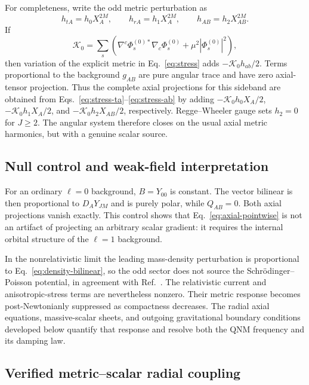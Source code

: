 For completeness, write the odd metric perturbation as
\begin{equation}
h_{tA}=h_0X_A^{2M},\qquad h_{rA}=h_1X_A^{2M},\qquad
h_{AB}=h_2X_{AB}^{2M}.
\label{eq:axial-metric}
\end{equation}
If
\begin{equation}
\mathcal K_0=\sum_s\left(
\nabla^c\Phi_s^{(0)*}\nabla_c\Phi_s^{(0)}
+\mu^2|\Phi_s^{(0)}|^2\right),
\end{equation}
then variation of the explicit metric in Eq.~\eqref{eq:stress} adds
$-\mathcal K_0h_{ab}/2$. Terms proportional to the background
$g_{AB}$ are pure angular trace and have zero axial-tensor projection. Thus
the complete axial projections for this sideband are obtained from
Eqs.~\eqref{eq:stress-ta}--\eqref{eq:stress-ab} by adding
$-\mathcal K_0h_0X_A/2$, $-\mathcal K_0h_1X_A/2$, and
$-\mathcal K_0h_2X_{AB}/2$, respectively. Regge--Wheeler gauge sets $h_2=0$
for $J\geq2$. The angular system therefore closes on the usual axial metric
harmonics, but with a genuine scalar source.

\subsection{Null control and weak-field interpretation}

For an ordinary $\ell=0$ background, $B=Y_{00}$ is constant. The vector
bilinear is then proportional to $D_AY_{JM}$ and is purely polar, while
$Q_{AB}=0$. Both axial projections vanish exactly. This control shows that
Eq.~\eqref{eq:axial-pointwise} is not an artifact of projecting an arbitrary
scalar gradient: it requires the internal orbital structure of the
$\ell=1$ background.

In the nonrelativistic limit the leading mass-density perturbation is
proportional to Eq.~\eqref{eq:density-bilinear}, so the odd sector does not
source the Schr\"odinger--Poisson potential, in agreement with
Ref.~\cite{ChavezNambo2024}. The relativistic current and anisotropic-stress
terms are nevertheless nonzero. Their metric response becomes
post-Newtonianly suppressed as compactness decreases. The radial axial
equations, massive-scalar sheets, and outgoing gravitational boundary
conditions developed below quantify that response and resolve both the QNM
frequency and its damping law.

\subsection{Verified metric--scalar radial coupling}

